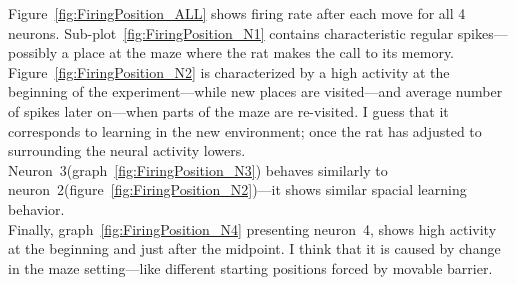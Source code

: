 \documentclass[11pt,a4paper,twocolumn]{article}
\begin{document}
Figure~\ref{fig:FiringPosition_ALL} shows firing rate after each move for all 4 neurons. Sub-plot~\ref{fig:FiringPosition_N1} contains characteristic regular spikes---possibly a place at the maze where the rat makes the call to its memory.\\
Figure~\ref{fig:FiringPosition_N2} is characterized by a high activity at the beginning of the experiment---while new places are visited---and average number of spikes later on---when parts of the maze are re-visited. I guess that it corresponds to learning in the new environment; once the rat has adjusted to surrounding the neural activity lowers.\\
Neuron~3(graph~\ref{fig:FiringPosition_N3}) behaves similarly to neuron~2(figure~\ref{fig:FiringPosition_N2})---it shows similar spacial learning behavior.\\
Finally, graph~\ref{fig:FiringPosition_N4} presenting neuron~4, shows high activity at the beginning and just after the midpoint. I think that it is caused by change in the maze setting---like different starting positions forced by movable barrier.\\
\end{document}
